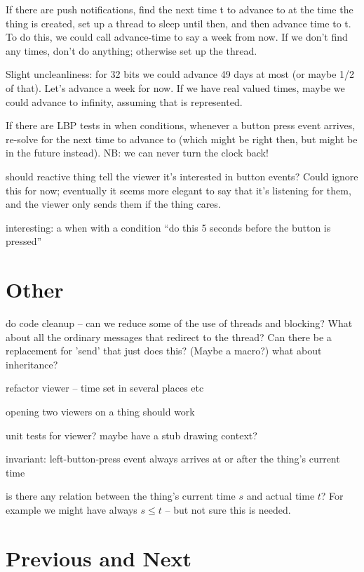 \documentclass{article}
\begin{document}
If there are push notifications, find the next time t to advance to at the
time the thing is created, set up a thread to sleep until then, and then
advance time to t.  To do this, we could call advance-time to say a week
from now.  If we don't find any times, don't do anything; otherwise set up
the thread.

Slight uncleanliness: for 32 bits we could advance 49 days at most (or
maybe 1/2 of that).  Let's advance a week for now.  If we have real valued
times, maybe we could advance to infinity, assuming that is represented.

If there are LBP tests in when conditions, whenever a button press event
arrives, re-solve for the next time to advance to (which might be right
then, but might be in the future instead).  NB: we can never turn the clock
back!

should reactive thing tell the viewer it's interested in button events?
Could ignore this for now; eventually it seems more elegant to say that
it's listening for them, and the viewer only sends them if the thing cares.


interesting: a when with a condition ``do this 5 seconds before the button
is pressed''






\section{Other}

do code cleanup -- can we reduce some of the use of threads and blocking?
What about all the ordinary messages that redirect to the thread?  Can
there be a replacement for 'send' that just does this?  (Maybe a macro?)
what about inheritance?

refactor viewer -- time set in several places etc

opening two viewers on a thing should work

unit tests for viewer?  maybe have a stub drawing context?

invariant: left-button-press event always arrives at or after the thing's
current time

is there any relation between the thing's current time $s$ and actual time $t$?
For example we might have always $s \leq t$ -- but not sure this is needed.

\section{Previous and Next}
\end{document}
